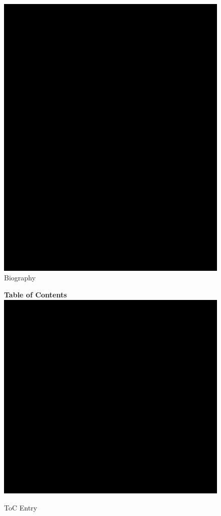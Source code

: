 \documentclass{WileyMSP-template}
\begin{document}
\begin{figure}
  \includegraphics{bio-placeholder.jpg}
  \caption*{Biography}
\end{figure}




\begin{figure}
\textbf{Table of Contents}\\
\medskip
  \includegraphics{toc-image.png}
  \medskip
  \caption*{ToC Entry}
\end{figure}
\end{document}
